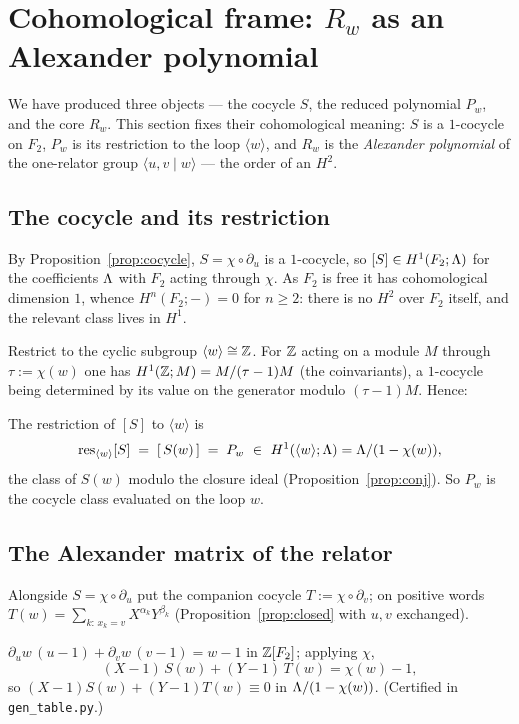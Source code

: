 \section{Cohomological frame: $R_w$ as an Alexander polynomial}

We have produced three objects --- the cocycle $S$, the reduced polynomial $P_w$, and the core
$R_w$. This section fixes their cohomological meaning: $S$ is a $1$-cocycle on $F_2$, $P_w$ is
its restriction to the loop $\langle w\rangle$, and $R_w$ is the \emph{Alexander polynomial} of
the one-relator group $\langle u,v\mid w\rangle$ --- the order of an $H^2$.

\subsection*{The cocycle and its restriction}

By Proposition~\ref{prop:cocycle}, $S=\chi\circ\partial_u$ is a $1$-cocycle, so
$[S]\in H^1(F_2;\Lambda)$ for the coefficients $\Lambda$ with $F_2$ acting through $\chi$. As $F_2$ is
free it has cohomological dimension $1$, whence $H^n(F_2;-)=0$ for $n\ge2$: there is no $H^2$
over $F_2$ itself, and the relevant class lives in $H^1$.

Restrict to the cyclic subgroup $\langle w\rangle\cong\mathbb{Z}$. For $\mathbb{Z}$ acting on a module $M$
through $\tau:=\chi(w)$ one has $H^1(\mathbb{Z};M)=M/(\tau-1)M$ (the coinvariants), a $1$-cocycle being
determined by its value on the generator modulo $(\tau-1)M$. Hence:

\begin{prop}\label{prop:restrict}
The restriction of $[S]$ to $\langle w\rangle$ is
\[
   \operatorname{res}_{\langle w\rangle}[S]\;=\;[\,S(w)\,]\;=\;P_w
   \ \in\ H^1(\langle w\rangle;\Lambda)=\Lambda/(1-\chi(w)),
\]
the class of $S(w)$ modulo the closure ideal (Proposition~\ref{prop:conj}). So $P_w$ is the
cocycle class evaluated on the loop $w$.
\end{prop}

\subsection*{The Alexander matrix of the relator}

Alongside $S=\chi\circ\partial_u$ put the companion cocycle $T:=\chi\circ\partial_v$; on positive
words $T(w)=\sum_{k:\,x_k=v}X^{\alpha_k}Y^{\beta_k}$ (Proposition~\ref{prop:closed} with $u,v$
exchanged).

\begin{lem}\label{lem:cf}
$\partial_u w\,(u-1)+\partial_v w\,(v-1)=w-1$ in $\mathbb{Z}[F_2]$; applying $\chi$,
\[
   (X-1)\,S(w)+(Y-1)\,T(w)=\chi(w)-1 ,
\]
so $(X-1)S(w)+(Y-1)T(w)\equiv0$ in $\Lambda/(1-\chi(w))$. (Certified in \texttt{gen\_table.py}.)
\end{lem}

